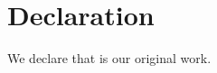 \section*{Declaration}
We declare that \thesistitle{} is our original work.\par
\studentAname\quad\studentBname\quad\studentCname\quad\studentDname\par
\clearpage

